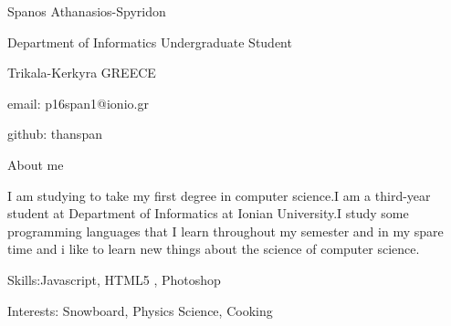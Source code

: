 \documentclass[11pt]{article}
\begin{document}
                   Spanos Athanasios-Spyridon
                   
     Department of Informatics Undergraduate Student
     
     Trikala-Kerkyra GREECE
     
     email: p16span1@ionio.gr
     
     github: thanspan
     
                   About me
                   
       I am studying to take my first degree in computer science.I am a third-year student at Department of Informatics at Ionian University.I study some programming languages that I learn throughout my semester and in my spare time and i like to learn new things about the science of computer science.
  
             Skills:Javascript, HTML5 , Photoshop  
                                  
             Interests: Snowboard, Physics Science, Cooking
\end{document}
